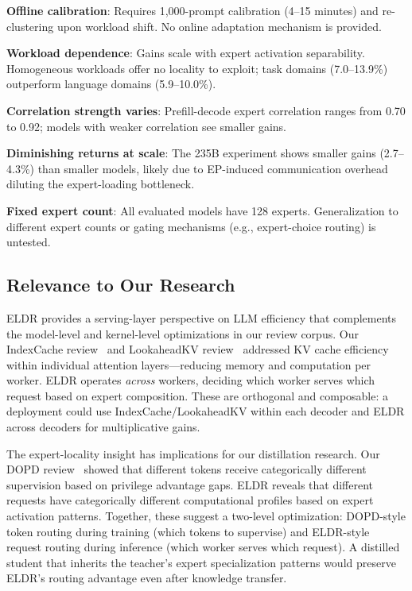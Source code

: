 \documentclass[11pt,a4paper]{article}
\begin{document}
\textbf{Offline calibration}: Requires 1,000-prompt calibration (4--15 minutes) and re-clustering upon workload shift. No online adaptation mechanism is provided.

\textbf{Workload dependence}: Gains scale with expert activation separability. Homogeneous workloads offer no locality to exploit; task domains (7.0--13.9\%) outperform language domains (5.9--10.0\%).

\textbf{Correlation strength varies}: Prefill-decode expert correlation ranges from 0.70 to 0.92; models with weaker correlation see smaller gains.

\textbf{Diminishing returns at scale}: The 235B experiment shows smaller gains (2.7--4.3\%) than smaller models, likely due to EP-induced communication overhead diluting the expert-loading bottleneck.

\textbf{Fixed expert count}: All evaluated models have 128 experts. Generalization to different expert counts or gating mechanisms (e.g., expert-choice routing) is untested.

\subsection{Relevance to Our Research}

ELDR provides a serving-layer perspective on LLM efficiency that complements the model-level and kernel-level optimizations in our review corpus. Our IndexCache review~\cite{indexcache2026} and LookaheadKV review~\cite{lookaheadkv2026} addressed KV cache efficiency within individual attention layers---reducing memory and computation per worker. ELDR operates \emph{across} workers, deciding which worker serves which request based on expert composition. These are orthogonal and composable: a deployment could use IndexCache/LookaheadKV within each decoder and ELDR across decoders for multiplicative gains.

The expert-locality insight has implications for our distillation research. Our DOPD review~\cite{yu2026dopd} showed that different tokens receive categorically different supervision based on privilege advantage gaps. ELDR reveals that different requests have categorically different computational profiles based on expert activation patterns. Together, these suggest a two-level optimization: DOPD-style token routing during training (which tokens to supervise) and ELDR-style request routing during inference (which worker serves which request). A distilled student that inherits the teacher's expert specialization patterns would preserve ELDR's routing advantage even after knowledge transfer.
\end{document}
